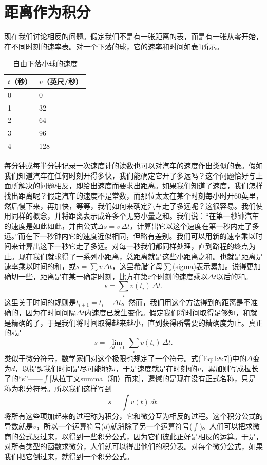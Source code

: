 \section{距离作为积分}
现在我们讨论相反的问题。假定我们不是有一张距离的表，而是有一张从零开始，在不同时刻的速率表。对一个下落的球，它的速率和时间如表\ref{tab:8.4}所示。
\begin{table}[H]
\centering
\caption{自由下落小球的速度}
\label{tab:8.4}
\medskip 
\begin{tabular}{@{}ll@{}}
\toprule
$t$（秒） & $v$（英尺/秒）  \\ \midrule
0  & 0  \\
1  & 32 \\
2  & 64 \\
3  & 96 \\
4  & 128 
 \\ \bottomrule
\end{tabular}
\end{table}

每分钟或每半分钟记录一次速度计的读数也可以对汽车的速度作出类似的表。假如我们知道汽车在任何时刻开得多快，我们能确定它开了多远吗？这个问题恰好与上面所解决的问题相反，即给出速度而要求出距离。如果我们知道了速度，我们怎样找出距离呢？假定汽车的速度不是常数，而那位太太在某个时刻每小时开60英里，然后慢下来，再加快，等等，我们如何来确定汽车走了多远呢？这很容易。我们使用同样的概念，并将距离表示成许多个无穷小量之和。我们说：“在第一秒钟汽车的速度是如此如此，并由公式$\Delta s=v\,\Delta t$，计算出它以这个速度在第一秒内走了多远。”而在下一秒钟内它的速度近似相同，但略有差别。我们可以用新的速率乘以时间来计算出这下一秒它走了多远。对每一秒我们都同样处理，直到路程的终点为止。现在我们就求得了一系列小距离，总距离就是这些小距离之和。也就是距离是速率乘以时间的和，或$s=\sum v\,\Delta t$，这里希腊字母$\sum$(sigma)表示累加。说得更加确切一些，距离是在某一确定时刻，比方在第$i$个时刻的速度乘以$\Delta t$以后的和。
\begin{equation}
\label{Eq:I:8:6}
s=\sum_iv(t_i)\,\Delta t.
\end{equation}
这里关于时间的规则是$t_{i+1}=t_i+\Delta t$。然而，我们用这个方法得到的距离是不准确的，因为在时间间隔$\Delta t$内速度已发生变化。假定我们将时间取得足够短，和就是精确的了，于是我们将时间取得越来越小，直到获得所需要的精确度为止。真正的$s$是
\begin{equation}
\label{Eq:I:8:7}
s=\lim_{\Delta t\to0}\sum_iv(t_i)\,\Delta t.
\end{equation}
类似于微分符号，数学家们对这个极限也规定了一个符号。式(\ref{Eq:I:8:7})中的$\Delta$变为$d$，以提醒我们时间是尽可能地短，于是速度就是在时刻$t$的$v$，累加则写成拉长了的“s”——$\int$[从拉丁文summa（和）而来]，遗憾的是现在没有正式名称，只是称为积分符号。所以我们这样写到
\begin{equation}
\label{Eq:I:8:8}
s=\int v(t)\,dt.
\end{equation}
将所有这些项加起来的过程称为积分，它和微分互为相反的过程。这个积分公式的导数就是$v$，所以一个运算符号($d$)就消除了另一个运算符号($\int$)。人们可以把求微商的公式反过来，以得到一些积分公式，因为它们彼此正好是相反的运算。于是，对所有类型的函数求微分，人们就可以得出他们的积分表。对每个微分公式，如果我们把它倒过来，就得到一个积分公式。

